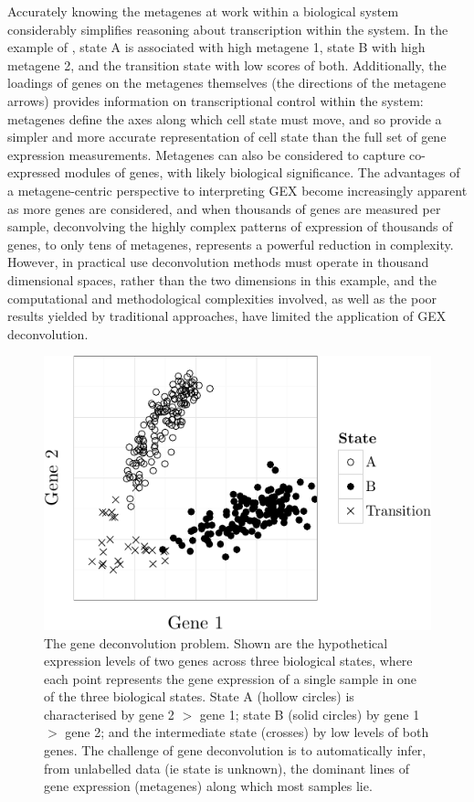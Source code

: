 \documentclass[dissertation.tex]{subfiles}
\begin{document}
Accurately knowing the metagenes at work within a biological system considerably simplifies reasoning about transcription within the system.  In the example of , state A is associated with high metagene 1, state B with high metagene 2, and the transition state with low scores of both.  Additionally, the loadings of genes on the metagenes themselves (the directions of the metagene arrows) provides information on transcriptional control within the system: metagenes define the axes along which cell state must move, and so provide a simpler and more accurate representation of cell state than the full set of gene expression measurements.  Metagenes can also be considered to capture co-expressed modules of genes, with likely biological significance.  The advantages of a metagene-centric perspective to interpreting \gls{GEX} become increasingly apparent as more genes are considered, and when thousands of genes are measured per sample, deconvolving the highly complex patterns of expression of thousands of genes, to only tens of metagenes, represents a powerful reduction in complexity.  However, in practical use deconvolution methods must operate in thousand dimensional spaces, rather than the two dimensions in this example, and the computational and methodological complexities involved, as well as the poor results yielded by traditional approaches, have limited the application of \gls{GEX} deconvolution.

\begin{figure}[!htbp]
\centering
\includegraphics[width=.7\linewidth]{analysis/biosurv/reports/PCA_ICA_NMF_comparison/figure/plots-1}
\caption[Illustration of the gene deconvolution problem]{The gene deconvolution problem.  Shown are the hypothetical expression levels of two genes across three biological states, where each point represents the gene expression of a single sample in one of the three biological states.  State A (hollow circles) is characterised by gene 2 $>$ gene 1; state B (solid circles) by gene 1 $>$ gene 2; and the intermediate state (crosses) by low levels of both genes.  The challenge of gene deconvolution is to automatically infer, from unlabelled data (ie state is unknown), the dominant lines of gene expression (metagenes) along which most samples lie.}\label{fig:sigs-example-matrixfactor-data}
\end{figure}
\end{document}
